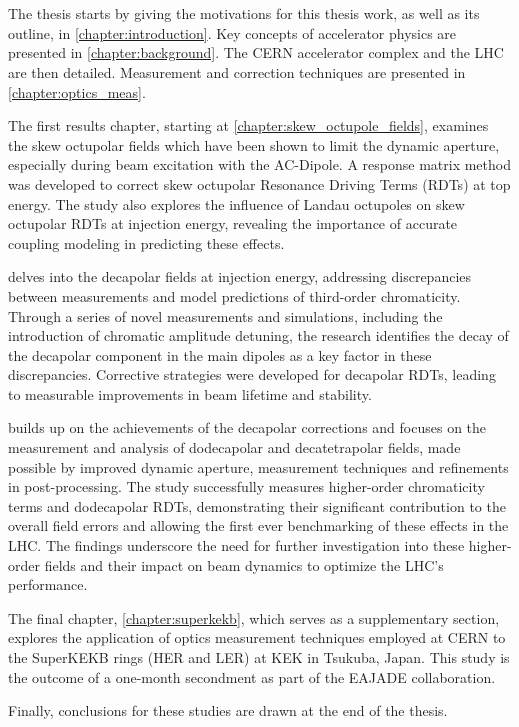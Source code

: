 \section{}

The thesis starts by giving the motivations for this thesis work, as well as its outline, in
\cref{chapter:introduction}. Key concepts of accelerator physics are presented in
\cref{chapter:background}. The CERN accelerator complex and the LHC are then detailed. Measurement
and correction techniques are presented in \cref{chapter:optics_meas}.

The first results chapter, starting at \cref{chapter:skew_octupole_fields}, examines the skew octupolar fields
which have been shown to limit the dynamic aperture, especially during beam excitation with the
AC-Dipole. A response matrix method was developed to correct skew octupolar Resonance Driving Terms
(RDTs) at top energy. The study also explores the influence of Landau octupoles on skew octupolar
RDTs at injection energy, revealing the importance of accurate coupling modeling in predicting these
effects.

 delves into the decapolar fields at injection energy,
addressing discrepancies between measurements and model predictions of third-order chromaticity.
Through a series of novel measurements and simulations, including the introduction of chromatic
amplitude detuning, the research identifies the decay of the decapolar component in the main dipoles
as a key factor in these discrepancies. Corrective strategies were developed for decapolar RDTs,
leading to measurable improvements in beam lifetime and stability.

 builds up on the achievements of the decapolar
corrections and focuses on the measurement and analysis of dodecapolar and decatetrapolar fields,
made possible by improved dynamic aperture, measurement techniques and refinements in 
post-processing.
The study successfully measures higher-order chromaticity terms and dodecapolar RDTs, demonstrating
their significant contribution to the overall field errors and allowing the first ever benchmarking
of these effects in the LHC. The findings underscore the need for further investigation into these
higher-order fields and their impact on beam dynamics to optimize the LHC's performance.

The final chapter, \cref{chapter:superkekb}, which serves as a supplementary section, explores the
application of optics measurement techniques employed at CERN to the SuperKEKB rings (HER and LER)
at KEK in Tsukuba, Japan. This study is the outcome of a one-month secondment as part of the EAJADE
collaboration.

Finally, conclusions for these studies are drawn at the end of the thesis.